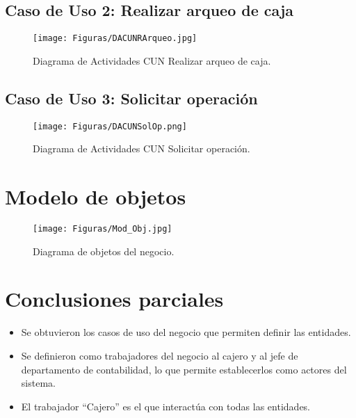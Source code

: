 \subsection{Caso de Uso 2: Realizar arqueo de caja}
\begin{center}
	\begin{figure}[H] %
		\centering
		\texttt{[image: Figuras/DACUNRArqueo.jpg]}
		\caption{\sf Diagrama de Actividades CUN Realizar arqueo de caja.}
		\label{fig:DACUNRArqueo}
	\end{figure}
\end{center}


\subsection{Caso de Uso 3: Solicitar operación}
\begin{figure}[H] %
	\centering
	\texttt{[image: Figuras/DACUNSolOp.png]}
	\caption{\sf Diagrama de Actividades CUN Solicitar operación.}
	\label{fig:DACUNSolOp}
\end{figure}

\section{Modelo de objetos}
\begin{figure}[H] %
	\centering
	\texttt{[image: Figuras/Mod\_Obj.jpg]}
	\caption{Diagrama de objetos del negocio.}
	\label{fig:Mod_Obj}
\end{figure}

\section{Conclusiones parciales}
\begin{itemize}
	\item Se obtuvieron los	casos de uso del negocio que permiten definir las entidades.
	\item Se definieron como trabajadores del negocio al cajero y al jefe de departamento de contabilidad, lo que permite establecerlos como actores del sistema.
	\item El trabajador “Cajero” es el que interactúa con todas las entidades.
\end{itemize}